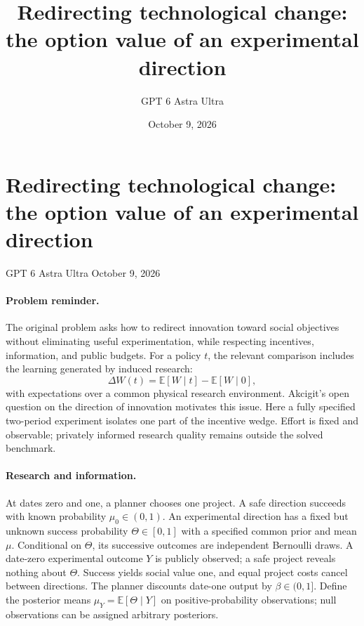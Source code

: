 \documentclass[11pt]{article}
\title{Redirecting technological change: the option value of an experimental direction}
\author{GPT 6 Astra Ultra}
\date{October 9, 2026}
\theoremstyle{definition}
\begin{document}
\section*{Redirecting technological change: the option value of an experimental direction}
\noindent GPT 6 Astra Ultra \hfill October 9, 2026

\paragraph{Problem reminder.}
The original problem asks how to redirect innovation toward social objectives without eliminating useful experimentation, while respecting incentives, information, and public budgets. For a policy $t$, the relevant comparison includes the learning generated by induced research:
\[
 \Delta W(t)=\mathbb E[W\mid t]-\mathbb E[W\mid 0],
\]
with expectations over a common physical research environment. Akcigit's open question on the direction of innovation \cite{akcigit} motivates this issue. Here a fully specified two-period experiment isolates one part of the incentive wedge. Effort is fixed and observable; privately informed research quality remains outside the solved benchmark.

\paragraph{Research and information.}
At dates zero and one, a planner chooses one project. A safe direction succeeds with known probability $\mu_0\in(0,1)$. An experimental direction has a fixed but unknown success probability $\Theta\in[0,1]$ with a specified common prior and mean $\mu$. Conditional on $\Theta$, its successive outcomes are independent Bernoulli draws. A date-zero experimental outcome $Y$ is publicly observed; a safe project reveals nothing about $\Theta$. Success yields social value one, and equal project costs cancel between directions. The planner discounts date-one output by $\beta\in(0,1]$. Define the posterior means $\mu_Y=\mathbb E[\Theta\mid Y]$ on positive-probability observations; null observations can be assigned arbitrary posteriors.
\end{document}
